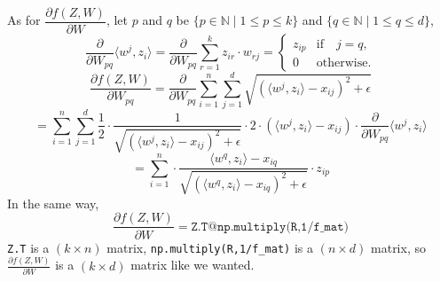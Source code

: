 \documentclass{article}
\begin{document}
As for $\dfrac{\partial f(Z,W)}{\partial W}$, let $p$ and $q$ be $\{p \in \mathbb{N} \mid 1\leq p \leq k \}$ and $\{q \in \mathbb{N} \mid 1\leq q \leq d \}$,
\[
\frac{\partial}{\partial W_{pq}} \langle w^j,z_i \rangle = \frac{\partial}{\partial W_{pq}} \sum_{r=1}^{k} z_{ir}\cdot w_{rj} =
\begin{cases}
	z_{ip} & \text{if} \quad j=q, \\
	0 & \text{otherwise.}
\end{cases}
\]
\[
\frac{\partial f(Z,W)}{\partial W_{pq}} = \frac{\partial}{\partial W_{pq}} \sum_{i=1}^n\sum_{j=1}^d \sqrt{\left(\langle w^j, z_i\rangle - x_{ij}\right)^2 + \epsilon}
\]
\[
= \sum_{i=1}^n\sum_{j=1}^d \frac{1}{2} \cdot \frac{1}{\sqrt{\left(\langle w^j, z_i\rangle - x_{ij}\right)^2 + \epsilon}} \cdot 2 \cdot \left(\langle w^j, z_i\rangle - x_{ij}\right) \cdot \frac{\partial}{\partial W_{pq}}\langle w^j,z_i \rangle
\]
\[
= \sum_{i=1}^{n}  \cdot \frac{\langle w^q, z_i \rangle - x_{iq}}{\sqrt{\left(\langle w^q, z_i \rangle - x_{iq}\right)^2 + \epsilon}} \cdot z_{ip}
\]
In the same way,
\[
\frac{\partial f(Z,W)}{\partial W} = \texttt{Z.T@np.multiply(R,1/f\_mat)} 
\]
\texttt{Z.T} is a $(k\times n)$ matrix, \texttt{np.multiply(R,1/f\_mat)} is a $(n\times d)$ matrix, so $\frac{\partial f(Z,W)}{\partial W}$ is a $(k\times d)$ matrix like we wanted. 
\end{document}
